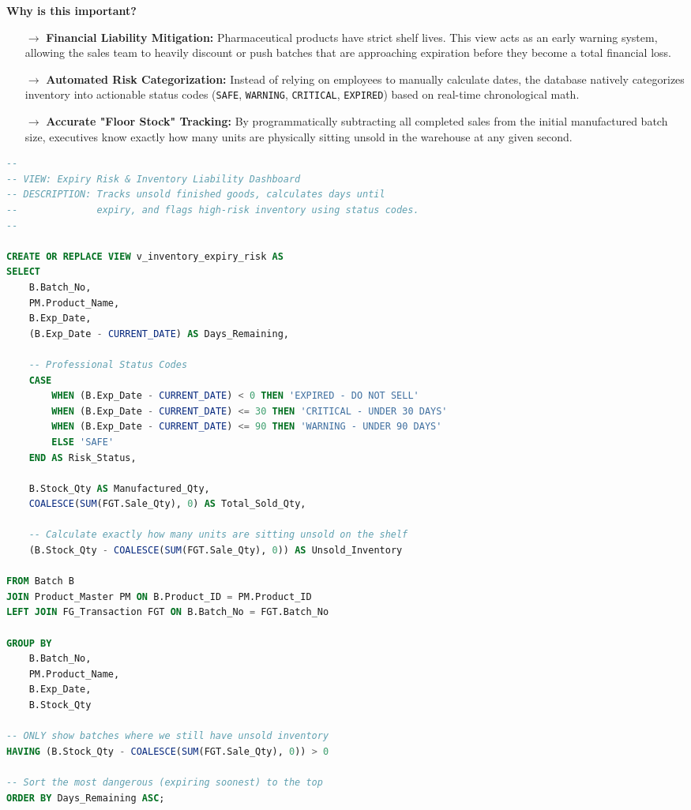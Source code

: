 \documentclass[12pt, a4paper]{article}
\begin{document}
\textbf{Why is this important?}
\begin{itemize}
    \item[$\rightarrow$] \textbf{Financial Liability Mitigation:} Pharmaceutical products have strict shelf lives. This view acts as an early warning system, allowing the sales team to heavily discount or push batches that are approaching expiration before they become a total financial loss.
    \item[$\rightarrow$] \textbf{Automated Risk Categorization:} Instead of relying on employees to manually calculate dates, the database natively categorizes inventory into actionable status codes (\texttt{SAFE}, \texttt{WARNING}, \texttt{CRITICAL}, \texttt{EXPIRED}) based on real-time chronological math.
    \item[$\rightarrow$] \textbf{Accurate "Floor Stock" Tracking:} By programmatically subtracting all completed sales from the initial manufactured batch size, executives know exactly how many units are physically sitting unsold in the warehouse at any given second.
\end{itemize}

\begin{lstlisting}[language=SQL]
-- 
-- VIEW: Expiry Risk & Inventory Liability Dashboard
-- DESCRIPTION: Tracks unsold finished goods, calculates days until 
--              expiry, and flags high-risk inventory using status codes.
-- 

CREATE OR REPLACE VIEW v_inventory_expiry_risk AS
SELECT 
    B.Batch_No,
    PM.Product_Name,
    B.Exp_Date,
    (B.Exp_Date - CURRENT_DATE) AS Days_Remaining,
    
    -- Professional Status Codes
    CASE 
        WHEN (B.Exp_Date - CURRENT_DATE) < 0 THEN 'EXPIRED - DO NOT SELL'
        WHEN (B.Exp_Date - CURRENT_DATE) <= 30 THEN 'CRITICAL - UNDER 30 DAYS'
        WHEN (B.Exp_Date - CURRENT_DATE) <= 90 THEN 'WARNING - UNDER 90 DAYS'
        ELSE 'SAFE'
    END AS Risk_Status,
    
    B.Stock_Qty AS Manufactured_Qty,
    COALESCE(SUM(FGT.Sale_Qty), 0) AS Total_Sold_Qty,
    
    -- Calculate exactly how many units are sitting unsold on the shelf
    (B.Stock_Qty - COALESCE(SUM(FGT.Sale_Qty), 0)) AS Unsold_Inventory

FROM Batch B
JOIN Product_Master PM ON B.Product_ID = PM.Product_ID
LEFT JOIN FG_Transaction FGT ON B.Batch_No = FGT.Batch_No

GROUP BY 
    B.Batch_No, 
    PM.Product_Name, 
    B.Exp_Date, 
    B.Stock_Qty

-- ONLY show batches where we still have unsold inventory
HAVING (B.Stock_Qty - COALESCE(SUM(FGT.Sale_Qty), 0)) > 0

-- Sort the most dangerous (expiring soonest) to the top
ORDER BY Days_Remaining ASC;
\end{lstlisting}
\end{document}
